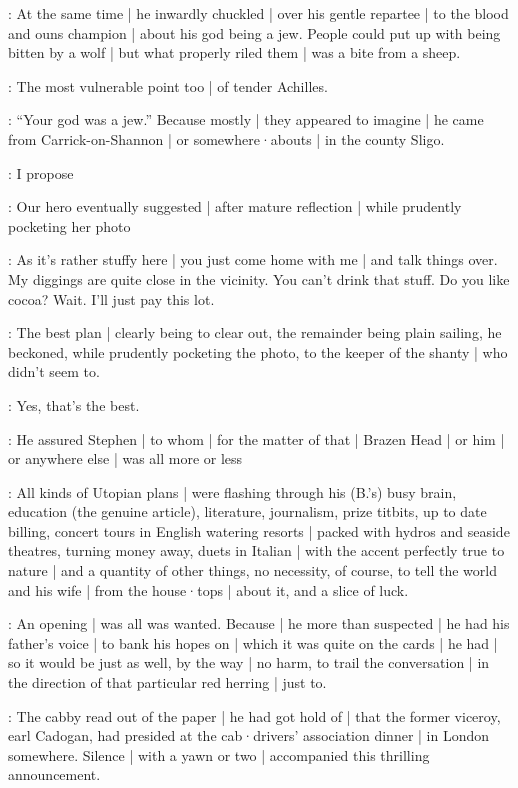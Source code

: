 :
At the same time |
he inwardly chuckled |
over his gentle repartee |
to the blood and ouns champion |
about his god being a jew.
People could put up with being bitten by a wolf |
but what properly riled them |
was a bite from a sheep.

:
The most vulnerable point too |
of tender Achilles.%

:
“Your god was a jew.”
Because mostly |
they appeared to imagine |
he came from Carrick-on-Shannon |
or somewhere·abouts |
in the county Sligo.

\Bloom:
I propose

:
Our hero eventually suggested |
after mature reflection |
while prudently pocketing her photo

\Bloom:
As it's rather stuffy here |
you just come home with me |
and talk things over.
My diggings are quite close in the vicinity.
You can't drink that stuff.
Do you like cocoa?
Wait.
I'll just pay this lot.

:
The best plan |
clearly being to clear out,
the remainder being plain sailing,
he beckoned,
while prudently pocketing the photo,
to the keeper of the shanty |
who didn't seem to.

\Bloom:
Yes,
that's the best.%

:
He assured Stephen |
to whom |
for the matter of that |
Brazen Head |
or him |
or anywhere else |
was all more or less

:
All kinds of Utopian plans |
were flashing through his (B.'s) busy brain,
education (the genuine article),
literature,
journalism,
prize titbits,
up to date billing,
concert tours in English watering resorts |
packed with hydros and seaside theatres,
turning money away,
duets in Italian |
with the accent perfectly true to nature |
and a quantity of other things,
no necessity,
of course,
to tell the world and his wife |
from the house·tops |
about it,
and a slice of luck.

:
An opening |
was all was wanted.
Because |
he more than suspected |
he had his father's voice |
to bank his hopes on |
which it was quite on the cards |
he had |
so it would be just as well,
by the way |
no harm,
to trail the conversation |
in the direction of that particular red herring |
just to.

:
The cabby read out of the paper |
he had got hold of |
that the former viceroy,
earl Cadogan,
had presided at the cab·drivers' association dinner |
in London somewhere.
Silence |
with a yawn or two |
accompanied this thrilling announcement.

